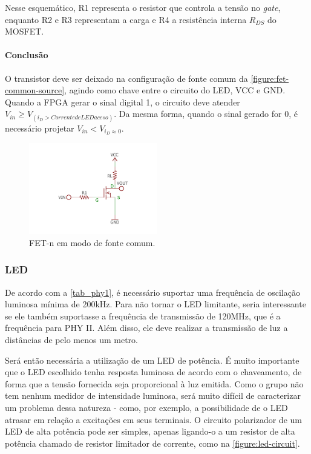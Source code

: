 	Nesse esquemático, R1 representa o resistor que controla a tensão no \textit{gate}, enquanto R2 e R3 representam a carga e R4 a resistência interna $R_{DS}$ do MOSFET.
	
	\paragraph{Conclusão}
	
	O transistor deve ser deixado na configuração de fonte comum da \autoref{figure:fet-common-source}, agindo como chave entre o circuito do LED, VCC e GND. Quando a FPGA gerar o sinal digital 1, o circuito deve atender $V_{in} \geq V_{(i_{D} > Corrente de LED aceso)}$. Da mesma forma, quando o sinal gerado for 0, é necessário projetar  $V_{in} < V_{i_{D} \approx 0}$.
	
	\begin{figure}[h]
		\caption{\label{figure:fet-common-source}FET-n em modo de fonte comum.}
		\centering
		\includegraphics[width=0.5\textwidth, trim={0cm 2cm 0cm 2cm}, clip]{circuits/mosfet_example.pdf}
	\end{figure}
	
	\subsubsection{LED}\label{method-hardware-led}

	De acordo com a \autoref{tab_phy1}, é necessário suportar uma frequência de oscilação luminosa mínima de 200kHz. Para não tornar o LED limitante, seria interessante se ele também suportasse a frequência de transmissão de 120MHz, que é a frequência para PHY II. Além disso, ele deve realizar a transmissão de luz a distâncias de pelo menos um metro.
	
	Será então necessária a utilização de um LED de potência. É muito importante que o LED escolhido tenha resposta luminosa de acordo com o chaveamento, de forma que a tensão fornecida seja proporcional à luz emitida. Como o grupo não tem nenhum medidor de intensidade luminosa, será muito difícil de caracterizar um problema dessa natureza - como, por exemplo, a possibilidade de o LED atrasar em relação a excitações em seus terminais. O circuito polarizador de um LED de alta potência pode ser simples, apenas ligando-o a um resistor de alta potência chamado de resistor limitador de corrente, como na \autoref{figure:led-circuit}.
	
